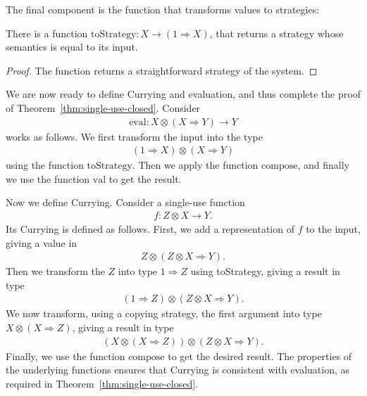 The final component is the function that transforms values to strategies: 
\begin{lemma}
    There is a function $\text{toStrategy} : X \to (1 \Rightarrow X)$, 
    that returns a strategy whose semantics is equal to its input.
 \end{lemma}
\begin{proof}
    The function returns a straightforward strategy of the system. 
\end{proof}

We are now ready to define Currying and evaluation, and thus  complete the proof of Theorem~\ref{thm:single-use-closed}. 
Consider 
\begin{align*}
\text{eval} : X \otimes (X \Rightarrow Y) \to Y
\end{align*}
works as follows. We first transform the input into the type
\begin{align*}
(1 \Rightarrow X) \otimes (X \Rightarrow Y) 
\end{align*}
using the function $\text{toStrategy}$. Then we apply the function $\text{compose}$, and finally we use the function $\text{val}$ to get the result.

Now we define Currying. Consider a single-use function
\begin{align*}
f : Z \otimes X \to Y.
\end{align*}
Its Currying is defined as follows. First, we add a representation of $f$ to the input, giving a value in 
\begin{align*}
Z \otimes (Z \otimes X \Rightarrow Y).
\end{align*}
Then we transform the $Z$ into type $1 \Rightarrow Z$ using toStrategy, giving a result in type 
\begin{align*}
(1 \Rightarrow Z) \otimes (Z \otimes X \Rightarrow Y).
\end{align*}
We now transform, using a copying strategy, the first argument into type $X \otimes (X \Rightarrow Z)$, giving a result in type
\begin{align*}
(X \otimes (X \Rightarrow Z))  \otimes (Z \otimes X \Rightarrow Y).
\end{align*}
Finally, we use the function $\text{compose}$ to get the desired result.  The properties of the underlying functions ensures that Currying is consistent with evaluation, as required in Theorem~\ref{thm:single-use-closed}.




